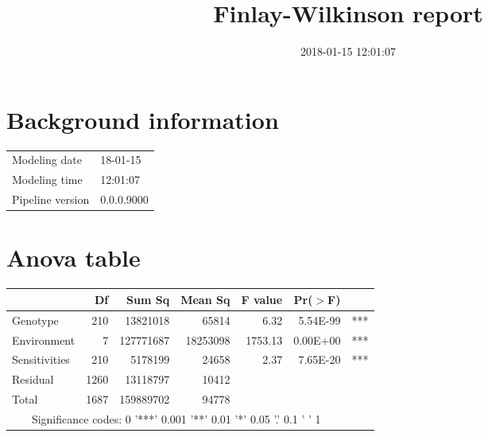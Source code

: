 \documentclass[a4paper,11pt]{article}\usepackage[]{graphicx}\usepackage[]{color}
\title{Finlay-Wilkinson report}%
\author{\vspace{-5ex}}
\date{2018-01-15 12:01:07}
\begin{document}
\maketitle
\singlespacing

\section{Background information}
\begin{table}[ht]
\begin{flushleft}
\begin{tabular}{ll}
  Modeling date & 18-01-15 \\ 
  Modeling time & 12:01:07 \\ 
  Pipeline version & 0.0.0.9000 \\ 
  \end{tabular}
\label{background}
\end{flushleft}
\end{table}


\section{Anova table}

\begin{table}[ht]
\begin{flushleft}
\begin{tabular}{lrrrrrl}
  \hline
 & Df & Sum Sq & Mean Sq & F value & Pr($>$F) &  \\ 
  \hline
Genotype & 210 & 13821018 & 65814 & 6.32 & 5.54E-99 & *** \\ 
  Environment & 7 & 127771687 & 18253098 & 1753.13 & 0.00E+00 & *** \\ 
  Sensitivities & 210 & 5178199 & 24658 & 2.37 & 7.65E-20 & *** \\ 
  Residual & 1260 & 13118797 & 10412 &  &  &  \\ 
  Total & 1687 & 159889702 & 94778 &  &  &  \\ 
   \hline  \multicolumn{6}{c}{Significance codes:  0 '***' 0.001 '**' 0.01 '*' 0.05 '.' 0.1 ' ' 1} \\ \hline
\end{tabular}
\label{anova}
\end{flushleft}
\end{table}
\end{document}
